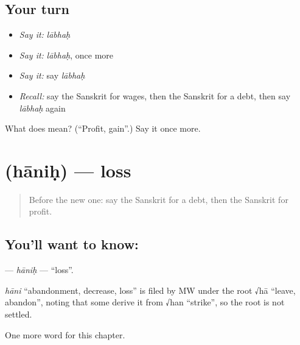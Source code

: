 \subsection*{Your turn}
\begin{itemize}
\raggedright
  \item \emph{Say it:} \emph{lābhaḥ}
  \item \emph{Say it:} \emph{lābhaḥ}, once more
  \item \emph{Say it:} say \emph{lābhaḥ}
  \item \emph{Recall:} say the Sanskrit for wages, then the Sanskrit for a debt, then say \emph{lābhaḥ} again
\end{itemize}

\begin{tcolorbox}[breakable,colback=teal!4,colframe=teal!35!black,title={Before you move on}]
What does  mean? (\textquotedblleft{}Profit, gain\textquotedblright{}.) Say it once more.
\end{tcolorbox}
\section[\texorpdfstring{\sk{हानिः} (hāniḥ)}{हानिः (hāniḥ)}]{ (hāniḥ) — loss}

\label{lesson:SA-C162-hanih}



\begin{quote}
Before the new one: say the Sanskrit for a debt, then the Sanskrit for profit.
\end{quote}

\subsection*{You'll want to know: }
\textbf{} — \emph{hāniḥ} — \textquotedblleft{}loss\textquotedblright{}.

\begin{cousinweb}
\emph{hāni} \textquotedblleft{}abandonment, decrease, loss\textquotedblright{} is filed by MW under the root √hā \textquotedblleft{}leave, abandon\textquotedblright{}, noting that some derive it from √han \textquotedblleft{}strike\textquotedblright{}, so the root is not settled.
\end{cousinweb}

\begin{grammarlens}[title={What you've built}]
One more word for this chapter.
\end{grammarlens}

